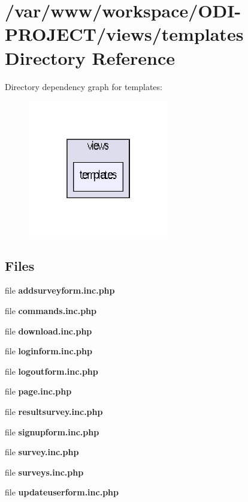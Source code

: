 \section{/var/www/workspace/\+O\+D\+I-\/\+P\+R\+O\+J\+E\+C\+T/views/templates Directory Reference}
\label{dir_6502a42b8be7086bc39fbb104b5c15d7}
Directory dependency graph for templates\+:\nopagebreak
\begin{figure}[H]
\begin{center}
\leavevmode
\includegraphics[width=174pt]{dir_6502a42b8be7086bc39fbb104b5c15d7_dep}
\end{center}
\end{figure}
\subsection*{Files}
\begin{DoxyCompactItemize}
\item 
file {\bfseries addsurveyform.\+inc.\+php}
\item 
file {\bfseries commands.\+inc.\+php}
\item 
file {\bfseries download.\+inc.\+php}
\item 
file {\bfseries loginform.\+inc.\+php}
\item 
file {\bfseries logoutform.\+inc.\+php}
\item 
file {\bfseries page.\+inc.\+php}
\item 
file {\bfseries resultsurvey.\+inc.\+php}
\item 
file {\bfseries signupform.\+inc.\+php}
\item 
file {\bfseries survey.\+inc.\+php}
\item 
file {\bfseries surveys.\+inc.\+php}
\item 
file {\bfseries updateuserform.\+inc.\+php}
\end{DoxyCompactItemize}
